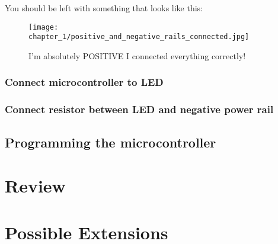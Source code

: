 You should be left with something that looks like this:
\begin{figure}[h!]
    \centering
    \texttt{[image: chapter\_1/positive\_and\_negative\_rails\_connected.jpg]}
    \caption{I'm absolutely POSITIVE I connected everything correctly!}
    \label{fig:positives_and_negatives}
\end{figure}

\subsubsection{Connect microcontroller to LED}

\subsubsection{Connect resistor between LED and negative power rail}

\subsection{Programming the microcontroller}

\section{Review}

\section{Possible Extensions}

